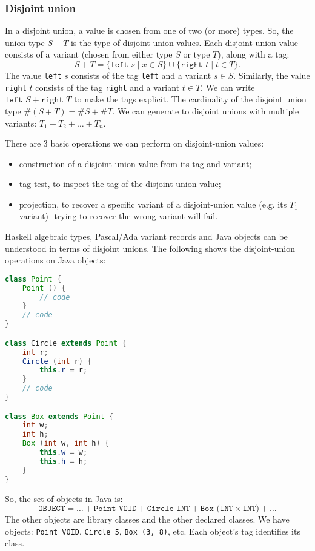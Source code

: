 \documentclass[a4paper, openany]{memoir}
\begin{document}
\subsubsection{Disjoint union}
In a disjoint union, a value is chosen from one of two (or more) types. So, the union type $S + T$ is the type of disjoint-union values. Each disjoint-union value consists of a variant (chosen from either type $S$ or type $T$), along with a tag:
\[S + T = \{\texttt{left } s \mid x \in S\} \cup \{\texttt{right } t \mid t \in T\}.\]
The value \texttt{left} $s$ consists of the tag \texttt{left} and a variant $s \in S$. Similarly, the value \texttt{right} $t$ consists of the tag \texttt{right} and a variant $t \in T$. We can write $\texttt{left } S + \texttt{right } T$ to make the tags explicit. The cardinality of the disjoint union type $\#(S + T) = \#S + \#T$. We can generate to disjoint unions with multiple variants: $T_1 + T_2 + \dots + T_n$.

There are 3 basic operations we can perform on disjoint-union values:
\begin{itemize}
    \item construction of a disjoint-union value from its tag and variant;
    \item tag test, to inspect the tag of the disjoint-union value;
    \item projection, to recover a specific variant of a disjoint-union value (e.g. its $T_1$ variant)- trying to recover the wrong variant will fail.
\end{itemize}

Haskell algebraic types, Pascal/Ada variant records and Java objects can be understood in terms of disjoint unions. The following shows the disjoint-union operations on Java objects:
\begin{lstlisting}[language=java]
class Point {
    Point () {
        // code
    }
    // code
}

class Circle extends Point {
    int r;
    Circle (int r) {
        this.r = r;
    }
    // code
}

class Box extends Point {
    int w;
    int h;
    Box (int w, int h) {
        this.w = w;
        this.h = h;
    }
}
\end{lstlisting}
So, the set of objects in Java is:
\[\texttt{OBJECT} = \dots + \texttt{Point VOID} + \texttt{Circle INT} + \texttt{Box (INT} \times \texttt{INT)} + \dots\]
The other objects are library classes and the other declared classes. We have objects: \texttt{Point VOID}, \texttt{Circle 5}, \texttt{Box (3, 8)}, etc. Each object's tag identifies its class.
\end{document}
